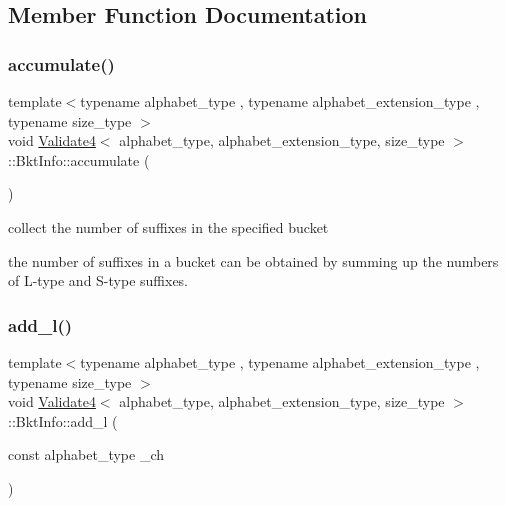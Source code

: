 \subsection{Member Function Documentation}
\mbox{\label{struct_validate4_1_1_bkt_info_ac4fb0eabb194f773cd4ac5f6bcbbe969}} 
\subsubsection{\texorpdfstring{accumulate()}{accumulate()}}
{\footnotesize\ttfamily template$<$typename alphabet\+\_\+type , typename alphabet\+\_\+extension\+\_\+type , typename size\+\_\+type $>$ \\
void \hyperlink{class_validate4}{Validate4}$<$ alphabet\+\_\+type, alphabet\+\_\+extension\+\_\+type, size\+\_\+type $>$\+::Bkt\+Info\+::accumulate (\begin{DoxyParamCaption}{ }\end{DoxyParamCaption})\hspace{0.3cm}{\ttfamily [inline]}}



collect the number of suffixes in the specified bucket 

the number of suffixes in a bucket can be obtained by summing up the numbers of L-\/type and S-\/type suffixes. \mbox{\label{struct_validate4_1_1_bkt_info_af55a2b8eee03bfe617ab34759b4ac007}} 
\subsubsection{\texorpdfstring{add\+\_\+l()}{add\_l()}}
{\footnotesize\ttfamily template$<$typename alphabet\+\_\+type , typename alphabet\+\_\+extension\+\_\+type , typename size\+\_\+type $>$ \\
void \hyperlink{class_validate4}{Validate4}$<$ alphabet\+\_\+type, alphabet\+\_\+extension\+\_\+type, size\+\_\+type $>$\+::Bkt\+Info\+::add\+\_\+l (\begin{DoxyParamCaption}\item[{const alphabet\+\_\+type}]{\+\_\+ch }\end{DoxyParamCaption})\hspace{0.3cm}{\ttfamily [inline]}}



